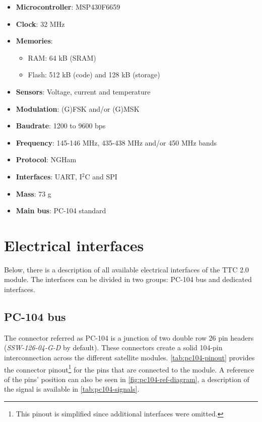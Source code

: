 \begin{itemize}
    \item \textbf{Microcontroller}: MSP430F6659
    \item \textbf{Clock}: 32 MHz
    \item \textbf{Memories}:
    \begin{itemize}
        \item RAM: 64 kB (SRAM)
        \item Flash: 512 kB (code) and 128 kB (storage)
    \end{itemize}
    \item \textbf{Sensors}: Voltage, current and temperature
    \item \textbf{Modulation}: (G)FSK and/or (G)MSK
    \item \textbf{Baudrate}: 1200 to 9600 bps
    \item \textbf{Frequency}: 145-146 MHz, 435-438 MHz and/or 450 MHz bands
    \item \textbf{Protocol}: NGHam
    \item \textbf{Interfaces}: UART, I$^{2}$C and SPI
    \item \textbf{Mass}: 73 g
    \item \textbf{Main bus}: PC-104 standard
\end{itemize}

\section{Electrical interfaces}

Below, there is a description of all available electrical interfaces of the TTC 2.0 module. The interfaces can be divided in two groups: PC-104 bus and dedicated interfaces.

\subsection{PC-104 bus}

The connector referred as PC-104 is a junction of two double row 26 pin headers (\textit{SSW-126-04-G-D} by default). These connectors create a solid 104-pin interconnection across the different satellite modules. \autoref{tab:pc104-pinout} provides the connector pinout\footnote{This pinout is simplified since additional interfaces were omitted.} for the pins that are connected to the module. A reference of the pins' position can also be seen in \autoref{fig:pc104-ref-diagram}, a description of the signal is available in \autoref{tab:pc104-signals}.

